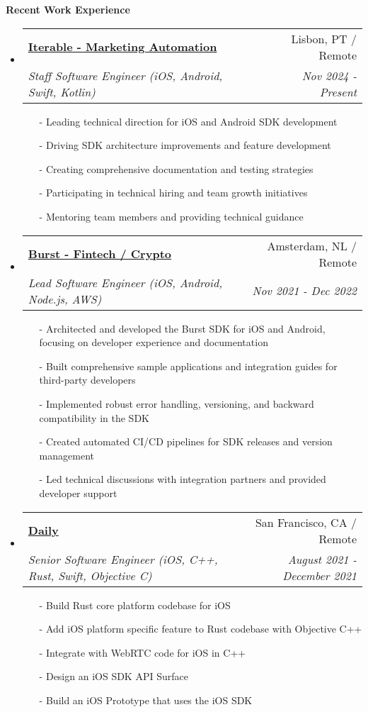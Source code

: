 \documentclass[letterpaper,11pt]{article}
\makeatletter
\newcommand{\resheading}[1]{{\large \colorbox{mygrey}{\begin{minipage}{\textwidth}{\textbf{#1 \vphantom{p\^{E}}}}\end{minipage}}}}
\newcommand{\ressubheading}[4]{
\begin{tabular*}{7.0in}{l@{\extracolsep{\fill}}r}
    \textbf{#1} & #2 \\
    \textit{#3} & \textit{#4} \\
\end{tabular*}\vspace{-6pt}}
\makeatother
\begin{document}
\resheading{Recent Work Experience}
\begin{itemize}

\item
    \ressubheading{\href{https://iterable.com}{Iterable - Marketing Automation}}{Lisbon, PT / Remote}{Staff Software Engineer (iOS, Android, Swift, Kotlin)}{Nov 2024 - Present}
    \begin{itemize}
        \item[-]{Leading technical direction for iOS and Android SDK development}
        \item[-]{Driving SDK architecture improvements and feature development}
        \item[-]{Creating comprehensive documentation and testing strategies}
        \item[-]{Participating in technical hiring and team growth initiatives}
        \item[-]{Mentoring team members and providing technical guidance}
    \end{itemize}

\item
    \ressubheading{\href{https://www.joinburst.com}{Burst - Fintech / Crypto \texttt{}}}{Amsterdam, NL / Remote}{Lead Software Engineer (iOS, Android, Node.js, AWS)}{Nov 2021 - Dec 2022}
    \begin{itemize}
        \item[-]{Architected and developed the Burst SDK for iOS and Android, focusing on developer experience and documentation}
        \item[-]{Built comprehensive sample applications and integration guides for third-party developers}
        \item[-]{Implemented robust error handling, versioning, and backward compatibility in the SDK}
        \item[-]{Created automated CI/CD pipelines for SDK releases and version management}
        \item[-]{Led technical discussions with integration partners and provided developer support}
    \end{itemize}

\item
    \ressubheading{\href{https://daily.co}{Daily \texttt{}}}{San Francisco, CA / Remote}{Senior Software Engineer (iOS, C++, Rust, Swift, Objective C)}{August 2021 - December 2021}
    \begin{itemize}
        \item[-]{Build Rust core platform codebase for iOS}
        \item[-]{Add iOS platform specific feature to Rust codebase with Objective C++}
        \item[-]{Integrate with WebRTC code for iOS in C++}
        \item[-]{Design an iOS SDK API Surface}
        \item[-]{Build an iOS Prototype that uses the iOS SDK}
    \end{itemize}


\end{itemize}
\end{document}
